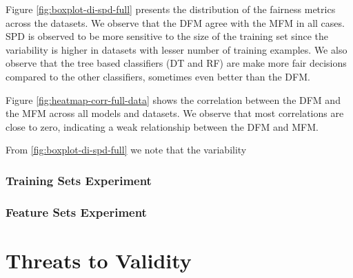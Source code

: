 \documentclass{article}
\begin{document}
Figure \ref{fig:boxplot-di-spd-full} presents the distribution of the
fairness metrics across the datasets. We observe that the DFM agree
with the MFM in all cases. SPD is observed to be more sensitive to the
size of the training set since the variability is higher in datasets
with lesser number of training examples. We also observe that the tree
based classifiers (DT and RF) are make more fair decisions compared to
the other classifiers, sometimes even better than the DFM.

Figure \ref{fig:heatmap-corr-full-data} shows the correlation between
the DFM and the MFM across all models and datasets. We observe that
most correlations are close to zero, indicating a weak relationship
between the DFM and MFM. 

From \ref{fig:boxplot-di-spd-full} we note that the variability



\subsubsection{Training Sets Experiment}

\subsubsection{Feature Sets Experiment}

\section{Threats to Validity}\label{sec:threats}
\end{document}
